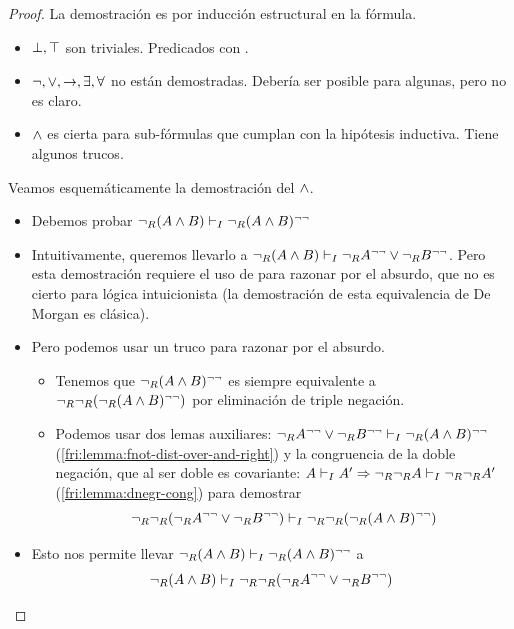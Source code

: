 \begin{proof}
    La demostración es por inducción estructural en la fórmula.
    \begin{itemize}
        \item $\bot, \top$ son triviales. Predicados con .
        \item $\neg, \vee, \to, \exists, \forall$ no están demostradas. Debería ser posible para algunas, pero no es claro.
        \item $\wedge$ es cierta para sub-fórmulas que cumplan con la hipótesis inductiva. Tiene algunos trucos.
    \end{itemize}

    Veamos esquemáticamente la demostración del $\wedge$.
    \begin{itemize}
        \item Debemos probar $\neg_R (A \wedge B) \vdash_I \neg_R (A \wedge B)^{\neg\neg}$
        \item Intuitivamente, queremos llevarlo a $\neg_R (A \wedge B) \vdash_I \neg_R A^{\neg\neg} \vee \neg_R B^{\neg\neg}$. Pero esta demostración requiere el uso de  para razonar por el absurdo, que no es cierto para lógica intuicionista (la demostración de esta equivalencia de De Morgan es clásica).
        \item Pero podemos usar un truco para razonar por el absurdo.
        \begin{itemize}
        \item Tenemos que $\neg_R (A \wedge B)^{\neg\neg}$ es siempre equivalente a $\neg_R \neg_R (\neg_R (A \wedge B)^{\neg\neg})$ por eliminación de triple negación.
        \item Podemos usar dos lemas auxiliares: $\neg_R A^{\neg\neg} \vee \neg_R B^{\neg\neg} \vdash_I \neg_R (A \wedge B)^{\neg\neg}$ (\ref{fri:lemma:fnot-dist-over-and-right}) y la congruencia de la doble negación, que al ser doble es covariante: $A \vdash_I A' \Rightarrow \neg_R \neg_R A \vdash_I \neg_R \neg_R A'$ (\ref{fri:lemma:dnegr-cong}) para demostrar 
        \[
            \neg_R \neg_R (\neg_R A^{\neg\neg} \vee \neg_R B^{\neg\neg})
            \vdash_I
            \neg_R \neg_R (\neg_R (A \wedge B)^{\neg\neg})
        \]
        \end{itemize}
        \item Esto nos permite llevar $\neg_R (A \wedge B) \vdash_I \neg_R (A \wedge B)^{\neg\neg}$ a \[\neg_R (A \wedge B) \vdash_I \neg_R \neg_R (\neg_R A^{\neg\neg} \vee \neg_R B^{\neg\neg})\]
        

\end{itemize}
\end{proof}
